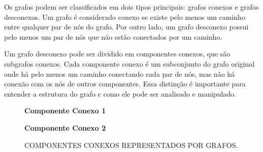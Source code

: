 Os grafos podem ser classificados em dois tipos principais: grafos conexos e grafos desconexos. Um grafo é considerado conexo se existe pelo menos um caminho entre qualquer par de nós do grafo. Por outro lado, um grafo desconexo possui pelo menos um par de nós que não estão conectados por um caminho.

Um grafo desconexo pode ser dividido em componentes conexos, que são subgrafos conexos. Cada componente conexo é um subconjunto do grafo original onde há pelo menos um caminho conectando cada par de nós, mas não há conexão com os nós de outros componentes. Essa distinção é importante para entender a estrutura do grafo e como ele pode ser analisado e manipulado.


\begin{figure}[ht]
    \caption{COMPONENTES CONEXOS REPRESENTADOS POR GRAFOS.}
    \centering
    \begin{minipage}{0.45\textwidth}
        \centering
        \textbf{Componente Conexo 1} \\[0.2cm]
    \end{minipage}
    \hfill
    \begin{minipage}{0.45\textwidth}
        \centering
        \textbf{Componente Conexo 2} \\[0.2cm]
    \end{minipage}
    \label{fig:componentes_conexos}
    \end{figure}

